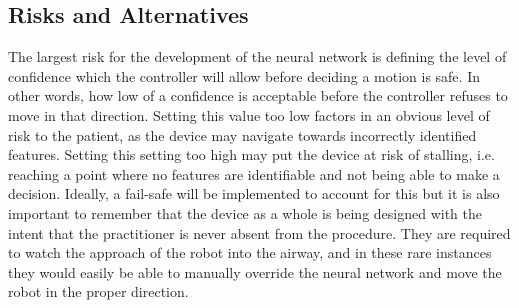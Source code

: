 \subsection{Risks and Alternatives}

	The largest risk for the development of the neural network is defining the level of confidence which the controller will allow before deciding a motion is safe. In other words, how low of a confidence is acceptable before the controller refuses to move in that direction. Setting this value too low factors in an obvious level of risk to the patient, as the device may navigate towards incorrectly identified features. Setting this setting too high may put the device at risk of stalling, i.e. reaching a point where no features are identifiable and not being able to make a decision. Ideally, a fail-safe will be implemented to account for this but it is also important to remember that the device as a whole is being designed with the intent that the practitioner is never absent from the procedure. They are required to watch the approach of the robot into the airway, and in these rare instances they would easily be able to manually override the neural network and move the robot in the proper direction.